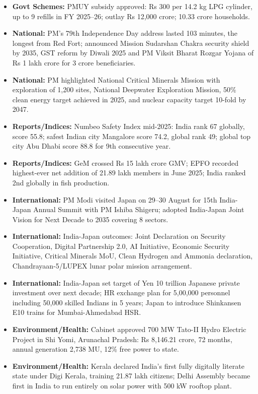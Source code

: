 \documentclass[10pt,a4paper]{article}
\begin{document}
\begin{itemize}
    \item \textbf{Govt Schemes:} PMUY subsidy approved: Rs 300 per 14.2 kg LPG cylinder, up to 9 refills in FY 2025--26; outlay Rs 12,000 crore; 10.33 crore households.
    \item \textbf{National:} PM's 79th Independence Day address lasted 103 minutes, the longest from Red Fort; announced Mission Sudarshan Chakra security shield by 2035, GST reform by Diwali 2025 and PM Viksit Bharat Rozgar Yojana of Rs 1 lakh crore for 3 crore beneficiaries.
    \item \textbf{National:} PM highlighted National Critical Minerals Mission with exploration of 1,200 sites, National Deepwater Exploration Mission, 50\% clean energy target achieved in 2025, and nuclear capacity target 10-fold by 2047.
    \item \textbf{Reports/Indices:} Numbeo Safety Index mid-2025: India rank 67 globally, score 55.8; safest Indian city Mangalore score 74.2, global rank 49; global top city Abu Dhabi score 88.8 for 9th consecutive year.
    \item \textbf{Reports/Indices:} GeM crossed Rs 15 lakh crore GMV; EPFO recorded highest-ever net addition of 21.89 lakh members in June 2025; India ranked 2nd globally in fish production.
    \item \textbf{International:} PM Modi visited Japan on 29--30 August for 15th India-Japan Annual Summit with PM Ishiba Shigeru; adopted India-Japan Joint Vision for Next Decade to 2035 covering 8 sectors.
    \item \textbf{International:} India-Japan outcomes: Joint Declaration on Security Cooperation, Digital Partnership 2.0, AI Initiative, Economic Security Initiative, Critical Minerals MoU, Clean Hydrogen and Ammonia declaration, Chandrayaan-5/LUPEX lunar polar mission arrangement.
    \item \textbf{International:} India-Japan set target of Yen 10 trillion Japanese private investment over next decade; HR exchange plan for 5,00,000 personnel including 50,000 skilled Indians in 5 years; Japan to introduce Shinkansen E10 trains for Mumbai-Ahmedabad HSR.
    \item \textbf{Environment/Health:} Cabinet approved 700 MW Tato-II Hydro Electric Project in Shi Yomi, Arunachal Pradesh: Rs 8,146.21 crore, 72 months, annual generation 2,738 MU, 12\% free power to state.
    \item \textbf{Environment/Health:} Kerala declared India's first fully digitally literate state under Digi Kerala, training 21.87 lakh citizens; Delhi Assembly became first in India to run entirely on solar power with 500 kW rooftop plant.

\end{itemize}
\end{document}
